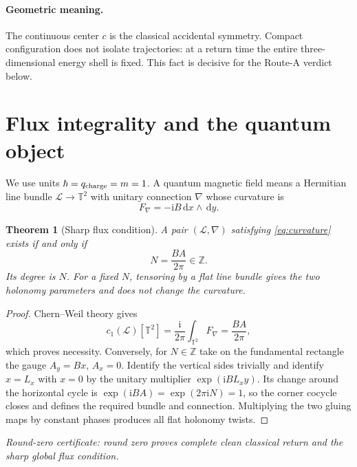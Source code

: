 \documentclass[10pt]{article}
\newcommand{\ZZ}{\mathbb Z}
\newcommand{\TT}{\mathbb T}
\newcommand{\ii}{\mathrm i}
\newcommand{\dd}{\,\mathrm d}
\newtheorem{theorem}{Theorem}
\begin{document}
\paragraph{Geometric meaning.}
The continuous center $c$ is the classical accidental symmetry.  Compact
configuration does not isolate trajectories: at a return time the entire
three-dimensional energy shell is fixed.  This fact is decisive for the
Route-A verdict below.

\section{Flux integrality and the quantum object}

We use units $\hbar=q_{\rm charge}=m=1$.  A quantum magnetic field means a
Hermitian line bundle $\mathcal L\to\TT^2$ with unitary connection $\nabla$
whose curvature is
\begin{equation}
 F_\nabla=-\ii B\dd x\wedge\dd y.                \label{eq:curvature}
\end{equation}

\begin{theorem}[Sharp flux condition]\label{thm:flux}
A pair $(\mathcal L,\nabla)$ satisfying \eqref{eq:curvature} exists if and
only if
\begin{equation}
 N=\frac{BA}{2\pi}\in\ZZ.                        \label{eq:flux}
\end{equation}
Its degree is $N$.  For a fixed $N$, tensoring by a flat line bundle gives
the two holonomy parameters and does not change the curvature.
\end{theorem}

\begin{proof}
Chern--Weil theory gives
\[
 c_1(\mathcal L)[\TT^2]=\frac{\ii}{2\pi}
 \int_{\TT^2}F_\nabla=\frac{BA}{2\pi},
\]
which proves necessity.  Conversely, for $N\in\ZZ$ take on the fundamental
rectangle the gauge $A_y=Bx$, $A_x=0$.  Identify the vertical sides
trivially and identify $x=L_x$ with $x=0$ by the unitary multiplier
$\exp(\ii BL_xy)$.  Its change around the horizontal cycle is
$\exp(\ii BA)=\exp(2\pi\ii N)=1$, so the corner cocycle closes and defines
the required bundle and connection.  Multiplying the two gluing maps by
constant phases produces all flat holonomy twists.
\end{proof}

\noindent\textit{Round-zero certificate: round zero proves complete clean
classical return and the sharp global flux condition.}
\end{document}
